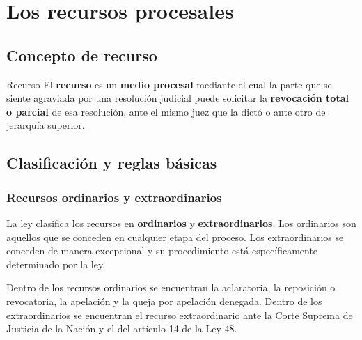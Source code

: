 \documentclass[12pt,oneside]{book}
\begin{document}
\chapter[Los recursos procesales]{Los recursos procesales}

\section{Concepto de recurso}

\begin{definition}{Recurso}
El \textbf{recurso} es un \textbf{medio procesal} mediante el cual la parte que se siente agraviada por una resoluci\'on judicial puede solicitar la \textbf{revocaci\'on total o parcial} de esa resoluci\'on, ante el mismo juez que la dict\'o o ante otro de jerarqu\'ia superior.
\end{definition}

\section{Clasificaci\'on y reglas b\'asicas}

\subsection{Recursos ordinarios y extraordinarios}

La ley clasifica los recursos en \textbf{ordinarios} y \textbf{extraordinarios}. Los ordinarios son aquellos que se conceden en cualquier etapa del proceso. Los extraordinarios se conceden de manera excepcional y su procedimiento est\'a espec\'ificamente determinado por la ley.

Dentro de los recursos ordinarios se encuentran la aclaratoria, la reposici\'on o revocatoria, la apelaci\'on y la queja por apelaci\'on denegada. Dentro de los extraordinarios se encuentran el recurso extraordinario ante la Corte Suprema de Justicia de la Naci\'on y el del art\'iculo 14 de la Ley 48.

\end{document}
